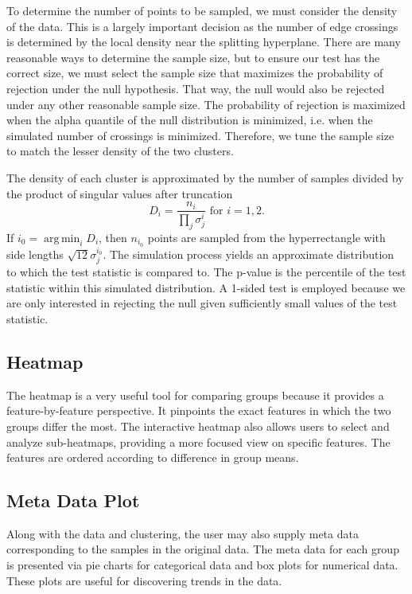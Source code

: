 \documentclass{article}
\DeclareMathOperator*{\argmin}{arg\,min}
\begin{document}
{To determine the number of points to be sampled, we must consider the density of the data. This is a largely important decision as the number of edge crossings is determined by the local density near the splitting hyperplane. There are many reasonable ways to determine the sample size, but to ensure our test has the correct size, we must select the sample size that maximizes the probability of rejection under the null hypothesis. That way, the null would also be rejected under any other reasonable sample size. The probability of rejection is maximized when the alpha quantile of the null distribution is minimized, i.e. when the simulated number of crossings is minimized. Therefore, we tune the sample size to match the lesser density of the two clusters.

The density of each cluster is approximated by the number of samples divided by the product of singular values after truncation $$D_i = \frac{n_i}{\prod_j \sigma_j^i} \textrm{ for } i=1,2.$$ If $i_0 = \argmin_i D_i$, then $n_{i_0}$ points are sampled from the hyperrectangle with side lengths $\sqrt{12}\sigma_j^{i_0}$. The simulation process yields an approximate distribution to which the test statistic is compared to. The p-value is the percentile of the test statistic within this simulated distribution. A 1-sided test is employed because we are only interested in rejecting the null given sufficiently small values of the test statistic.

\subsection{Heatmap}
The heatmap is a very useful tool for comparing groups because it provides a feature-by-feature perspective. It pinpoints the exact features in which the two groups differ the most. The interactive heatmap also allows users to select and analyze sub-heatmaps, providing a more focused view on specific features. The features are ordered according to difference in group means.

\subsection{Meta Data Plot}
Along with the data and clustering, the user may also supply meta data corresponding to the samples in the original data. The meta data for each group is presented via pie charts for categorical data and box plots for numerical data. These plots are useful for discovering trends in the data.

}
\end{document}

